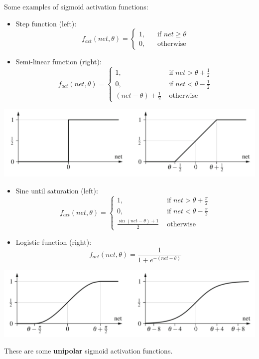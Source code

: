 Some examples of sigmoid activation functions:
\begin{itemize}
	\item Step function (left):
	$$ f_{act} (net, \theta) = \begin{cases}
		1, \;\; & \text{ if } net \geq \theta \\
		0, & \text{ otherwise}
	\end{cases} $$
	\item Semi-linear function (right):
	$$ f_{act} (net, \theta) = \begin{cases}
		1, \;\; & \text{ if } net > \theta + \frac{1}{2} \\
		0, & \text{ if } net < \theta - \frac{1}{2} \\
		(net - \theta) + \frac{1}{2} & \text{ otherwise}
	\end{cases} $$
\end{itemize}
\begin{center}
	\includegraphics[width=0.9\columnwidth]{img/NN/sigmoid1}
\end{center}

\newpage

\begin{itemize}
	\item Sine until saturation (left):
	$$ f_{act} (net, \theta) = \begin{cases}
		1, \;\; & \text{ if } net > \theta + \frac{\pi}{2} \\
		0, & \text{ if } net < \theta - \frac{\pi}{2} \\
		\frac{\sin(net - \theta) + 1}{2} & \text{ otherwise } 
	\end{cases} $$
	\item Logistic function (right):
	$$ f_{act} (net, \theta) = \frac{1}{1 + e^{-(net - \theta)}} $$
\end{itemize}
\begin{center}
	\includegraphics[width=0.9\columnwidth]{img/NN/sigmoid2}
\end{center}
These are some \textbf{unipolar} sigmoid activation functions.\\

